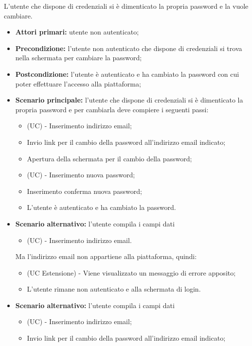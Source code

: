 L'utente che dispone di credenziali si è dimenticato la propria password e la vuole cambiare.
\begin{itemize}
    \item \textbf{Attori primari:} utente non autenticato;
    \item \textbf{Precondizione:} l'utente non autenticato che dispone di credenziali si trova nella schermata per cambiare la password;
    \item \textbf{Postcondizione:} l'utente è autenticato e ha cambiato la password con cui poter effettuare l'accesso alla piattaforma;
    \item \textbf{Scenario principale:} l'utente che dispone di credenziali si è dimenticato la propria password e per cambiarla deve compiere i seguenti passi:
    \begin{itemize}
        \item (UC) - Inserimento indirizzo email;
        \item Invio link per il cambio della password all'indirizzo email indicato;
        \item Apertura della schermata per il cambio della password;
        \item (UC) - Inserimento nuova password;
        \item Inserimento conferma nuova password;
        \item L'utente è autenticato e ha cambiato la password.
    \end{itemize}
	\item \textbf{Scenario alternativo:} l'utente compila i campi dati
	\begin{itemize}
		\item (UC) - Inserimento indirizzo email.
	\end{itemize}
	Ma l'indirizzo email non appartiene alla piattaforma, quindi:
	\begin{itemize}
		\item (UC Estensione) - Viene visualizzato un messaggio di errore apposito;
		\item L'utente rimane non autenticato e alla schermata di login.
	\end{itemize}
	\item \textbf{Scenario alternativo:} l'utente compila i campi dati
	\begin{itemize}
		\item (UC) - Inserimento indirizzo email;
		\item Invio link per il cambio della password all'indirizzo email indicato;

\end{itemize}
\end{itemize}
